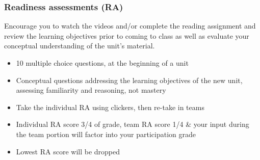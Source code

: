 \documentclass[11pt,containsverbatim,handout,xcolor=xelatex,dvipsnames,table]{beamer}
\begin{document}

\begin{frame}
\frametitle{Readiness assessments (RA)}

 Encourage you to watch the videos and/or complete the reading 
assignment and review the learning objectives prior to coming to class as well as 
evaluate your conceptual understanding of the unit's material.

\begin{itemize}

\item 10 multiple choice questions, at the beginning of a unit

\item Conceptual questions addressing the learning objectives of the new unit, 
assessing familiarity and reasoning, not mastery

\item Take the individual RA using clickers, then re-take in teams

\item Individual RA score 3/4 of grade, team RA score 1/4 \& your input during the 
team portion will factor into your participation grade

\item Lowest RA score will be dropped

\end{itemize}


\end{frame}

\end{document}
